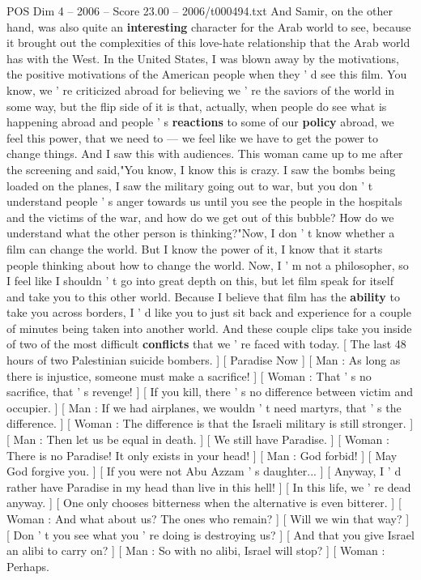 \begin{textsample}{POS Dim 4 – 2006 – Score 23.00 – 2006/t000494.txt}
And Samir, on the other hand, was also quite an \textbf{interesting} character for the Arab world to see, because it brought out the complexities of this love-hate relationship that the Arab world has with the West.
In the United States, I was blown away by the motivations, the positive motivations of the American people when they ' d see this film.
You know, we ' re criticized abroad for believing we ' re the saviors of the world in some way, but the flip side of it is that, actually, when people do see what is happening abroad and people ' s \textbf{reactions} to some of our \textbf{policy} abroad, we feel this power, that we need to — we feel like we have to get the power to change things.
And I saw this with audiences.
This woman came up to me after the screening and said,"You know, I know this is crazy.
I saw the bombs being loaded on the planes, I saw the military going out to war, but you don ' t understand people ' s anger towards us until you see the people in the hospitals and the victims of the war, and how do we get out of this bubble?
How do we understand what the other person is thinking?"Now, I don ' t know whether a film can change the world.
But I know the power of it, I know that it starts people thinking about how to change the world.
Now, I ' m not a philosopher, so I feel like I shouldn ' t go into great depth on this, but let film speak for itself and take you to this other world.
Because I believe that film has the \textbf{ability} to take you across borders, I ' d like you to just sit back and experience for a couple of minutes being taken into another world.
And these couple clips take you inside of two of the most difficult \textbf{conflicts} that we ' re faced with today. [ The last 48 hours of two Palestinian suicide bombers. ] [ Paradise Now ] [ Man : As long as there is injustice, someone must make a sacrifice! ] [ Woman : That ' s no sacrifice, that ' s revenge! ] [ If you kill, there ' s no difference between victim and occupier. ] [ Man : If we had airplanes, we wouldn ' t need martyrs, that ' s the difference. ] [ Woman : The difference is that the Israeli military is still stronger. ] [ Man : Then let us be equal in death. ] [ We still have Paradise. ] [ Woman : There is no Paradise!
It only exists in your head! ] [ Man : God forbid! ] [ May God forgive you. ] [ If you were not Abu Azzam ' s daughter... ] [ Anyway, I ' d rather have Paradise in my head than live in this hell! ] [ In this life, we ' re dead anyway. ] [ One only chooses bitterness when the alternative is even bitterer. ] [ Woman : And what about us?
The ones who remain? ] [ Will we win that way? ] [ Don ' t you see what you ' re doing is destroying us? ] [ And that you give Israel an alibi to carry on? ] [ Man : So with no alibi, Israel will stop? ] [ Woman : Perhaps.

\end{textsample}
